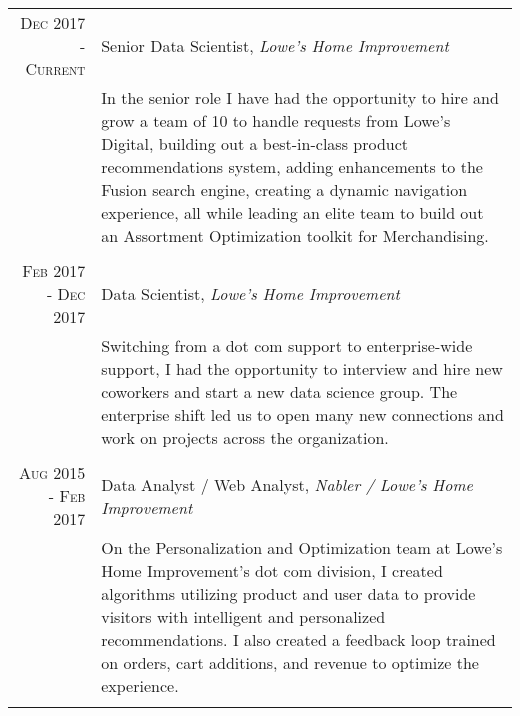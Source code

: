 \documentclass[a4paper,10pt]{article} %
\begin{document}
\begin{tabular}{r|p{11cm}}

\textsc{Dec 2017 - Current} & Senior Data Scientist, \emph{Lowe's Home Improvement} \\
& \footnotesize{In the senior role I have had the opportunity to hire and grow a team of 10 to handle requests from Lowe's Digital, building out a best-in-class product recommendations system, adding enhancements to the Fusion search engine, creating a dynamic navigation experience, all while leading an elite team to build out an Assortment Optimization toolkit for Merchandising.}\\

\multicolumn{2}{c}{} \\


\textsc{Feb 2017 - Dec 2017} & Data Scientist, \emph{Lowe's Home Improvement} \\
& \footnotesize{Switching from a dot com support to enterprise-wide support, I had the opportunity to interview and hire new coworkers and start a new data science group. The enterprise shift led us to open many new connections and work on projects across the organization.}\\

\multicolumn{2}{c}{} \\


\textsc{Aug 2015 - Feb 2017} &  Data Analyst / Web Analyst, \emph{Nabler / Lowe's Home Improvement} \\
& \footnotesize{On the Personalization and Optimization team at Lowe's Home Improvement's dot com division, I created algorithms utilizing product and user data to provide visitors with intelligent and personalized recommendations. I also created a feedback loop trained on orders, cart additions, and revenue to optimize the experience.}\\

\multicolumn{2}{c}{} \\



\end{tabular}
\end{document}
